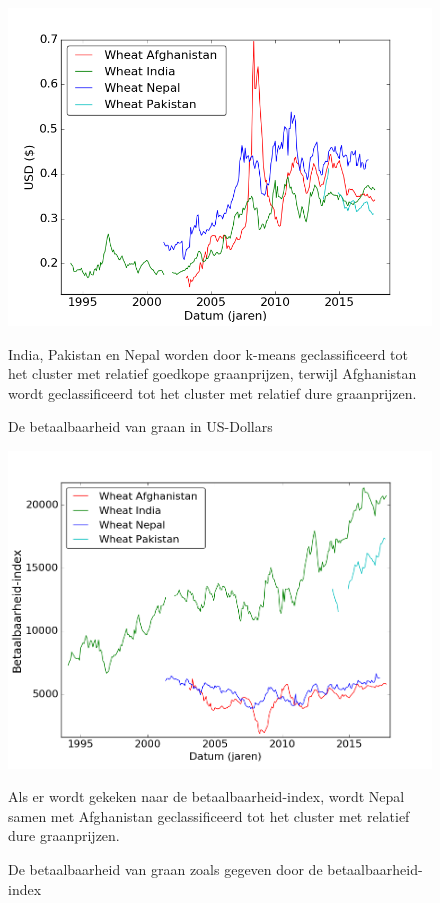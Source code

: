\documentclass{article}
\begin{document}
 
        \begin{figure}[ht!]
        \centering
        \includegraphics[scale=0.42]{images/wheat_vs4.png}
        \caption{De betaalbaarheid van graan in US-Dollars}
        \medskip
        \small
        India, Pakistan en Nepal worden door k-means geclassificeerd tot het cluster met relatief goedkope graanprijzen, terwijl Afghanistan wordt geclassificeerd tot het cluster met relatief dure graanprijzen.
        \end{figure}
        
        \begin{figure}[ht!]
        \centering
        \includegraphics[scale=0.42]{images/wheat_vs5.png}
        \caption{De betaalbaarheid van graan zoals gegeven door de betaalbaarheid-index}
        \medskip
        \small
        Als er wordt gekeken naar de betaalbaarheid-index, wordt Nepal samen met Afghanistan geclassificeerd tot het cluster met relatief dure graanprijzen.
        \end{figure}
        
\end{document}
